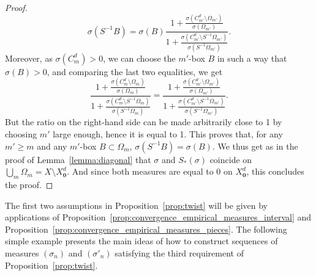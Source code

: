 \documentclass[10pt]{amsart}
\theoremstyle{definition}\newtheorem{defi}[theo]{Definition}\newtheorem{rema}[theo]{Remark}\newtheorem{exam}[theo]{Example}\newtheorem{exem}[theo]{Example}\newtheorem{nota}[theo]{Notation}
\newcommand{\cd}{C^{d}}
\newcommand{\bz}{\boldsymbol{0}}
\newcommand{\ovC}{\Omega}
\begin{document}
\begin{proof}
\[
\sigma(S^{-1}B)={\sigma(B)}
\dfrac{1+ \frac{\sigma(\cd_{m'}\setminus \ovC_{m'})}{\sigma(\ovC_{m'})} }{1+ \frac{\sigma(\cd_{m'}\setminus S^{-1}\ovC_{m'})}{\sigma(S^{-1}\ovC_{m'})} }.
\]
Moreover, as $\sigma(\cd_m)>0$, we can choose the $m'$-box $B$ in such a way that $\sigma(B)>0$, and comparing the last two equalities, we get
\[
\dfrac{1+ \frac{\sigma(\cd_m\setminus \ovC_m)}{\sigma(\ovC_m)} }{1+ \frac{\sigma(\cd_m\setminus S^{-1}\ovC_m)}{\sigma(S^{-1}\ovC_m)} } =
\dfrac{1+ \frac{\sigma(\cd_{m'}\setminus \ovC_{m'})}{\sigma(\ovC_{m'})} }{1+ \frac{\sigma(\cd_{m'}\setminus S^{-1}\ovC_{m'})}{\sigma(S^{-1}\ovC_{m'})} }.
\]
But the ratio on the right-hand side can be made arbitrarily close to 1 by choosing $m'$ large enough, hence it is equal to 1. This proves that, for any $m'\ge m$ and any $m'$-box $B\subset \ovC_m$, $\sigma(S^{-1}B)=\sigma(B)$. We thus get as in the proof of Lemma~\ref{lemma:diagonal} that $\sigma$ and $S_*(\sigma)$ coincide on $\bigcup_m \ovC_m=X\setminus X_{\bz}^d$. And since both measures are equal to 0 on $X_{\bz}^d$, this concludes the proof.
\end{proof}

The first two assumptions in Proposition~\ref{prop:twist} will be given by applications of Proposition~\ref{prop:convergence_empirical_measures_interval} and Proposition~\ref{prop:convergence_empirical_measures_pieces}. The following simple example presents the main ideas of how to construct sequences of measures $(\sigma_n)$ and $(\sigma'_n)$ satisfying the third requirement of Proposition~\ref{prop:twist}.
\end{document}
